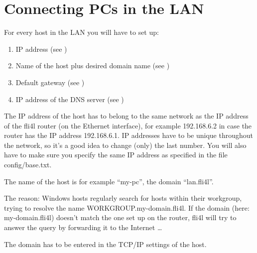   \chapter{Connecting PCs in the LAN}

  For every host in the LAN you will have to set up:

  \begin{enumerate}
  \item IP address (see )
  \item Name of the host plus desired domain name
    (see )
  \item Default gateway (see )
  \item IP address of the DNS server (see )
  \end{enumerate}

  The IP address of the host has to belong to the same network as the IP
  address of the fli4l router (on the Ethernet interface), for example
  192.168.6.2 in case the router has the IP address 192.168.6.1.
  IP addresses have to be unique throughout the network, so it's a good idea to
  change (only) the last number. You will also have to make sure you specify
  the same IP address as specified in the file config/base.txt.

  The name of the host is for example ``my-pc'', the domain ``lan.fli4l''.


  The reason: Windows hosts regularly search for hosts within their
  workgroup, trying to resolve the name WORKGROUP.my-domain.fli4l. If the domain (here:
  my-domain.fli4l) doesn't match the one set up on the router, fli4l will try
  to answer the query by forwarding it to the Internet \ldots

  The domain has to be entered in the TCP/IP settings of the host.

